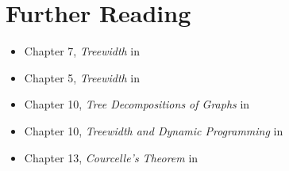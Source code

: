 \section{Further Reading}

\begin{frame}

  \begin{itemize}
   \item Chapter 7, \emph{Treewidth} in \cite{CyganFKL+15}
   \item Chapter 5, \emph{Treewidth} in \cite{FominK10}
   \item Chapter 10, \emph{Tree Decompositions of Graphs} in \cite{Niedermeier06}
   \item Chapter 10, \emph{Treewidth and Dynamic Programming} in \cite{DowneyF13}
   \item Chapter 13, \emph{Courcelle's Theorem} in \cite{DowneyF13}
  \end{itemize}

\end{frame}


\begin{frame}[t, allowframebreaks]
	\printbibliography
\end{frame}



